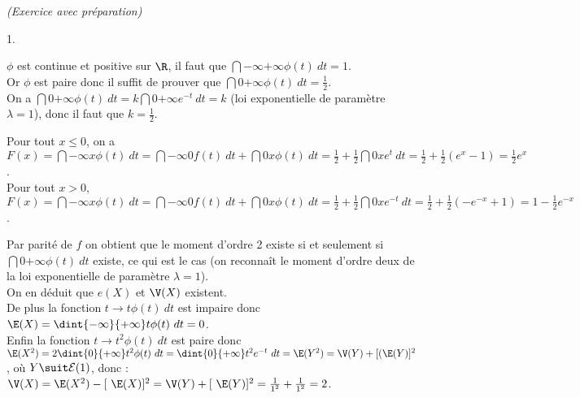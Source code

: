 \documentclass[11pt]{article}%
\begin{document}
\begin{exercice}{\it (Exercice avec préparation)}
\[\]
 \begin{noliste}{1.}
 \setlength{\itemsep}{4mm}
 \item $\phi$ est continue et positive sur $\R$, il faut que
$\dint{-\infty}{+ \infty} \phi(t)\ dt = 1$. \\
 Or $\phi$ est paire donc il suffit de prouver que $\dint{0}{+ \infty}
\phi (t)\ dt = \frac{1}{2}$. \\
 On a $\dint{0}{+ \infty} \phi (t)\ dt = k \dint{0}{+ \infty} e^{-t}\
dt = k$ (loi exponentielle de paramètre $\lambda = 1$), donc il faut
que $k = \frac{1}{2}$. \\
 \item Pour tout $x \leq 0$, on a $F (x) = \dint{-\infty}{x} \phi(t)\
dt = \dint{-\infty}{0} f(t)\ dt + \dint{0}{x} \phi(t)\ dt = \frac{1}{2}
+ \frac{1}{2} \dint{0}{x} e^{t}\ dt = \frac{1}{2} + \frac{1}{2} ( e^{x}
- 1) = \frac{1}{2} e^{x}$. \\
 Pour tout $x > 0$, $F(x) = \dint{-\infty}{x} \phi(t)\ dt =
\dint{-\infty}{0} f(t)\ dt + \dint{0}{x} \phi(t)\ dt = \frac{1}{2} +
\frac{1}{2} \dint{0}{x} e^{-t}\ dt = \frac{1}{2} + \frac{1}{2} (
-e^{-x} + 1) = 1 - \frac{1}{2} e^{-x}$. \\
 \item Par parité de $f$ on obtient que le moment d'ordre 2 existe si
et seulement si $\dint{0}{+ \infty} \phi (t)\ dt$ existe, ce qui est le
cas (on reconnaît le moment d'ordre deux de la loi exponentielle de
paramètre $\lambda = 1$). \\
 On en déduit que $e(X)$ et $\V(X)$ existent. \\
 De plus la fonction $t \rightarrow t \phi(t)\ dt$ est impaire donc
$\E(X) = \dint{-\infty}{+ \infty} t \phi (t)\ dt = 0$. \\
 Enfin la fonction $t \rightarrow t^{2} \phi(t)\ dt$ est paire donc
$\E(X^{2}) = 2 \dint{0}{+ \infty} t^{2} \phi (t)\ dt = \dint{0}{+
\infty} t^{2} e^{-t}\ dt = \E(Y^{2}) = \V(Y) + [ (\E(Y)]^{2}$, où $Y
\suit \mathcal{E} (1)$, donc : \\
 $\V(X) = \E(X^{2}) - [ \ \E(X)]^{2} = \V(Y) + [ \ \E(Y)]^{2} =
\frac{1}{1^{2}} + \frac{1}{1^{2}} = 2$. 
 \end{noliste}
 \end{exercice}

 \newpage
\end{document}
